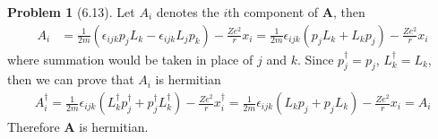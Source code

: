 \documentclass[twoside,11pt]{article}
\theoremstyle{definition}
\newtheorem{problem}{Problem}
\theoremstyle{remark}
\begin{document}
\begin{problem}[6.13]
Let $A_i$ denotes the $i$th component of $\mathbf{A}$, then 
\begin{align*}
    A_i &= \frac{1}{2m}(
        \epsilon_{ijk}p_jL_k - \epsilon_{ijk}L_jp_k
    ) - \frac{Ze^2 }{r}x_i = \frac{1}{2m}\epsilon_{ijk}
    (p_jL_k + L_kp_j) - \frac{Ze^2}{r}x_i
\end{align*}
where summation would be taken in place of $j$ and $k$.
Since $p_j^\dagger=p_j$, $L_k^\dagger=L_k$, then we can prove that
$A_i$ is hermitian
\begin{align*}
    A_i^\dagger  = 
    \frac{1}{2m}\epsilon_{ijk}
    (L_k^\dagger p_j^\dagger + p_j^\dagger L_k^\dagger) - \frac{Ze^2}{r}x_i^\dagger
    =
    \frac{1}{2m}\epsilon_{ijk}
    (L_kp_j+ p_jL_k) - \frac{Ze^2}{r}x_i = A_i
\end{align*}
Therefore $\mathbf{A}$ is hermitian.


\end{problem}
\end{document}
